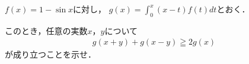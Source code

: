 \documentclass[../../main.tex]{subfiles}
\begin{document}
$f(x)=1-\sin x$に対し，
$\displaystyle g(x)=\int_0^x(x-t)f(t)dt$とおく．

このとき，任意の実数$x$，$y$について
\begin{align*}
  g(x+y)+g(x-y) \geqq 2g(x)
\end{align*}
が成り立つことを示せ．
\end{document}
